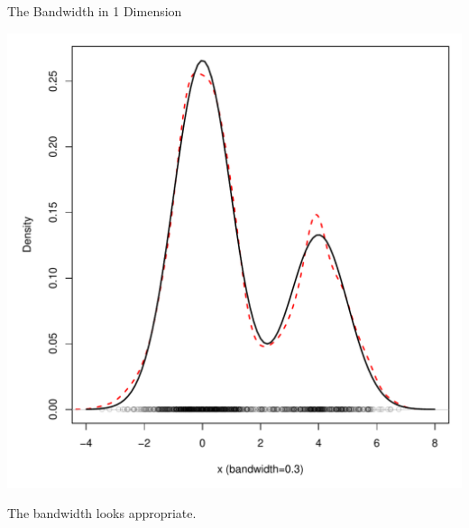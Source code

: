 \documentclass[12pt]{beamer}
\begin{document}
\begin{frame}{The Bandwidth in 1 Dimension}

  \begin{center}
    \includegraphics[scale=0.4]{figs/density2_1.pdf}
    \end{center}

\vspace{-.2in}
  
      \begin{center}
  The bandwidth looks appropriate.
      \end{center}
\end{frame}
\end{document}
